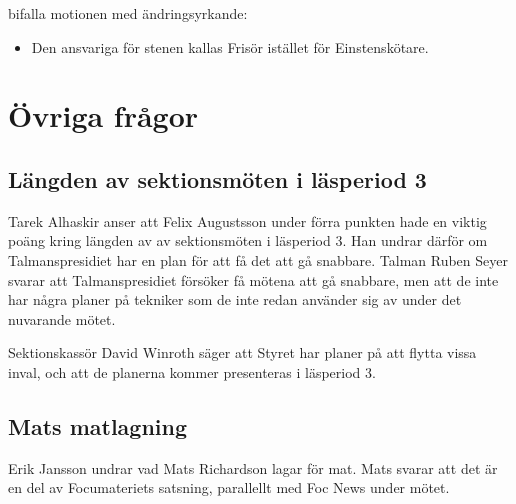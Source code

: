 \documentclass[hidelinks]{sektionsmote}
\begin{document}
\begin{beslut}
  \item bifalla motionen med ändringsyrkande:
  \begin{itemize}
    \item Den ansvariga för stenen kallas Frisör istället för Einstenskötare.
  \end{itemize}
\end{beslut}

\section{Övriga frågor}
\subsection{Längden av sektionsmöten i läsperiod 3}
Tarek Alhaskir anser att Felix Augustsson under förra punkten hade en viktig poäng kring längden av av sektionsmöten i läsperiod 3.
Han undrar därför om Talmanspresidiet har en plan för att få det att gå snabbare.
Talman Ruben Seyer svarar att Talmanspresidiet försöker få mötena att gå snabbare, men att de inte har några planer på tekniker som de inte redan använder sig av under det nuvarande mötet.\par
Sektionskassör David Winroth säger att Styret har planer på att flytta vissa inval, och att de planerna kommer presenteras i läsperiod 3.

\subsection{Mats matlagning}
Erik Jansson undrar vad Mats Richardson lagar för mat.
Mats svarar att det är en del av Focumateriets satsning, parallellt med Foc News under mötet.
\end{document}
